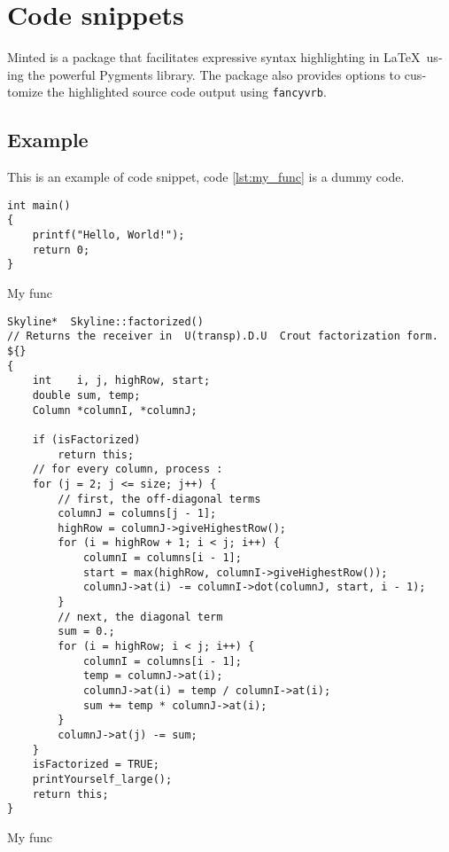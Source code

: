 \section{Code snippets}

Minted is a pack­age that fa­cil­i­tates ex­pres­sive syn­tax high­light­ing in \LaTeX\ us­ing the pow­er­ful Pyg­ments li­brary. The pack­age also pro­vides op­tions to cus­tomize the high­lighted source code out­put us­ing \texttt{fan­cyvrb}.

\subsection{Example}
This is an example of code snippet, code \ref{lst:my_func} is a dummy code.

\begin{codesnippet}
\begin{verbatim}
int main()
{
    printf("Hello, World!");
    return 0;
}
\end{verbatim}
\caption{My func}\label{lst:my_func}
\end{codesnippet}


%

\begin{codesnippet}
\begin{verbatim}
Skyline*  Skyline::factorized()
// Returns the receiver in  U(transp).D.U  Crout factorization form.
${}
{
	int    i, j, highRow, start;
	double sum, temp;
	Column *columnI, *columnJ;

	if (isFactorized)
		return this;
	// for every column, process :
	for (j = 2; j <= size; j++) {
		// first, the off-diagonal terms
		columnJ = columns[j - 1];
		highRow = columnJ->giveHighestRow();
		for (i = highRow + 1; i < j; i++) {
			columnI = columns[i - 1];
			start = max(highRow, columnI->giveHighestRow());
			columnJ->at(i) -= columnI->dot(columnJ, start, i - 1);
		}
		// next, the diagonal term
		sum = 0.;
		for (i = highRow; i < j; i++) {
			columnI = columns[i - 1];
			temp = columnJ->at(i);
			columnJ->at(i) = temp / columnI->at(i);
			sum += temp * columnJ->at(i);
		}
		columnJ->at(j) -= sum;
	}
	isFactorized = TRUE;
	printYourself_large();
	return this;
}
\end{verbatim}
\caption{My func}\label{lst:my_func}
\end{codesnippet}